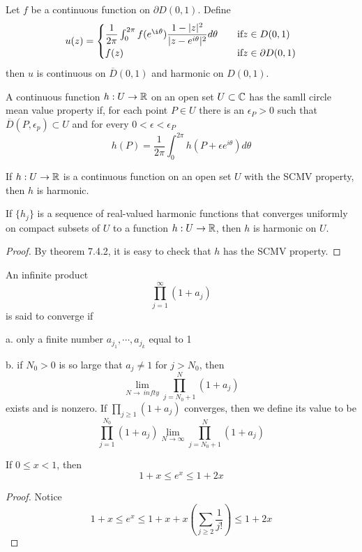 \begin{theorem}
    Let $f$ be a continuous function on $\partial D(0,1)$. Define
    \[
    u(z) = \begin{cases}
        \dfrac{1}{2\pi} \int_0^{2\pi} f(e^{\i\theta})\dfrac{1-|z|^2}{|z-e^{i\theta}|^2}d\theta\quad&\text{if}z\in D(0,1)\\
        f(z)&\text{if}z\in\partial D(0,1)
    \end{cases}
    \]
    then $u$ is continuous on $\overline{D}(0,1)$ and harmonic on $D(0,1)$.
\end{theorem}

\begin{definition}
    A continuous function $h:U\to\mathbb{R}$ on an open set $U\subset \mathbb{C}$ has the samll circle mean value property if, for each point $P\in U$ there is an $\epsilon_P>0$ such that $\overline{D}(P,\epsilon_p)\subset U$ and for every $0<\epsilon <\epsilon_P$
    \[h(P) = \dfrac{1}{2\pi}\int_0^{2\pi}h(P+\epsilon e^{i\theta})d\theta\]
\end{definition}
\begin{theorem}
    If $h:U\to\mathbb{R}$ is a continuous function on an open set $U$ with the SCMV property, then $h$ is harmonic.
\end{theorem}

\begin{corollary}
    If $\{h_j\}$ is a sequence of real-valued harmonic functions that converges uniformly on compact subsets of $U$ to a function $h:U\to\mathbb{R}$, then $h$ is harmonic on $U$.
\end{corollary}
\begin{proof}
    By theorem 7.4.2, it is easy to check that $h$ has the SCMV property.
\end{proof}

\begin{definition}
    An infinite product
    \[
    \prod_{j=1}^{\infty} (1+a_j)
    \]
    is said to converge if\par
    a. only a finite number $a_{j_1},\cdots,a_{j_k}$ equal to 1\par
    b. if $N_0>0$ is so large that $a_j\neq 1$ for $j>N_0$, then
    \[
    \lim_{N\to\ infty} \prod_{j= N_0+1}^N (1+a_j)
    \]
    exists and is nonzero. If $\prod_{j\geq 1} (1+a_j)$ converges, then we define its value to be
    \[
    \prod_{j=1}^{N_0}(1+a_j) \lim_{N\to\infty}\prod_{j=N_0+1}^N (1+a_j)
    \]
\end{definition}

\begin{lemma}
    If $0\leq x < 1$, then
    \[1+x \leq e^x \leq 1+2x\]
\end{lemma}
\begin{proof}
    Notice
    \[1+x \leq e^x \leq 1+x+x(\sum\limits_{j\geq 2}\dfrac{1}{j!}) \leq 1+2x\]
\end{proof}

